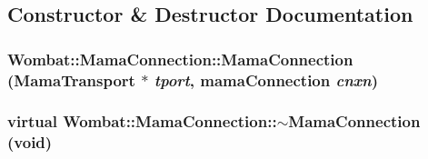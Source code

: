 \subsection{Constructor \& Destructor Documentation}
\hypertarget{classWombat_1_1MamaConnection_a8f18c427d99091a878c841b4e944478e}{
\subsubsection[{MamaConnection}]{\setlength{\rightskip}{0pt plus 5cm}Wombat::MamaConnection::MamaConnection ({\bf MamaTransport} $\ast$ {\em tport}, \/  mamaConnection {\em cnxn})}}
\label{classWombat_1_1MamaConnection_a8f18c427d99091a878c841b4e944478e}
\hypertarget{classWombat_1_1MamaConnection_a69556705b5c468e8a6259a1558f6b910}{
\subsubsection[{$\sim$MamaConnection}]{\setlength{\rightskip}{0pt plus 5cm}virtual Wombat::MamaConnection::$\sim$MamaConnection (void)}}
\label{classWombat_1_1MamaConnection_a69556705b5c468e8a6259a1558f6b910}


